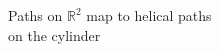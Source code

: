 \documentclass[preview]{standalone}
\begin{document}
\begin{center}
Paths on $\mathbb{R}^2$ map to helical paths\\on the cylinder
\end{center}
\end{document}
